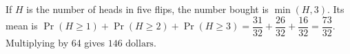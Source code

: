 If $H$ is the number of heads in five flips, the number bought is $\min(H,3)$. Its mean is $\Pr(H\ge1)+\Pr(H\ge2)+\Pr(H\ge3)=\dfrac{31}{32}+\dfrac{26}{32}+\dfrac{16}{32}=\dfrac{73}{32}$. Multiplying by 64 gives $\boxed{146\text{ dollars}}$.
